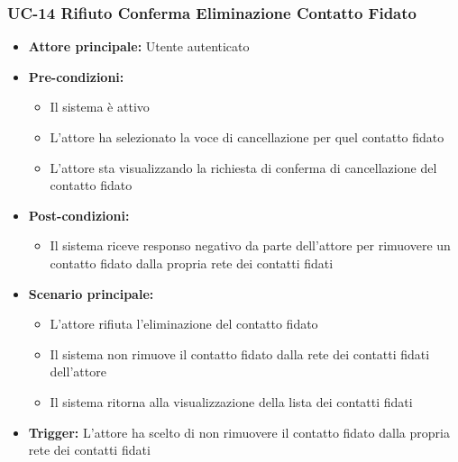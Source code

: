 \documentclass[a4paper,12pt]{article}
\begin{document}
\subsubsection{UC-14 Rifiuto Conferma Eliminazione Contatto Fidato} \label{subsec:UC-14}
\begin{itemize}
    \item \textbf{Attore principale:} Utente autenticato
    \item \textbf{Pre-condizioni:}
    \begin{itemize}
        \item Il sistema è attivo
        \item L'attore ha selezionato la voce di cancellazione per quel contatto fidato
        \item L'attore sta visualizzando la richiesta di conferma di cancellazione del contatto fidato
    \end{itemize}
    \item \textbf{Post-condizioni:}
    \begin{itemize}
        \item Il sistema riceve responso negativo da parte dell'attore per rimuovere un contatto fidato dalla propria rete dei contatti fidati
    \end{itemize}
    \item \textbf{Scenario principale:} 
    \begin{itemize}
        \item L'attore rifiuta l'eliminazione del contatto fidato
        \item Il sistema non rimuove il contatto fidato dalla rete dei contatti fidati dell'attore
        \item Il sistema ritorna alla visualizzazione della lista dei contatti fidati
    \end{itemize}
    \item \textbf{Trigger:} L'attore ha scelto di non rimuovere il contatto fidato dalla propria rete dei contatti fidati
\end{itemize}

\end{document}
